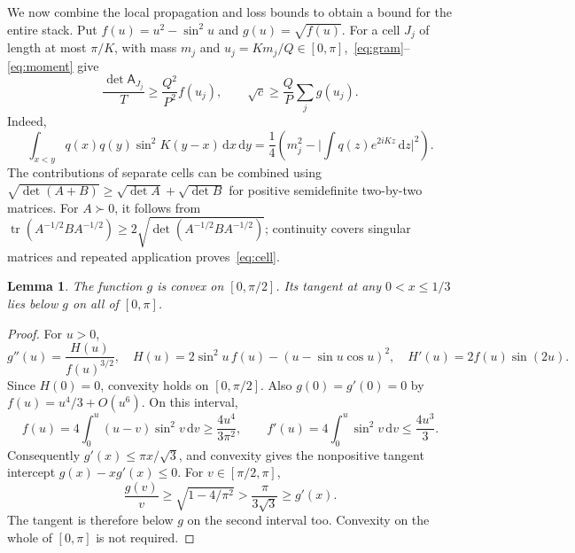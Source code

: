 \documentclass[11pt,a4paper]{article}
\newtheorem{lemma}[theorem]{Lemma}
\theoremstyle{remark}
\newcommand{\abs}[1]{\lvert #1\rvert}
\newcommand{\dd}{\,\mathrm d}
\newcommand{\tr}{\operatorname{tr}}
\begin{document}
We now combine the local propagation and loss bounds to obtain a bound for the entire stack. Put $f(u)=u^2-\sin^2u$ and $g(u)=\sqrt{f(u)}$. For a cell $J_j$ of length at most $\pi/K$, with mass $m_j$ and $u_j=Km_j/Q\in[0,\pi]$,~\eqref{eq:gram}--\eqref{eq:moment} give
\begin{equation}\label{eq:cell}
 \frac{\det\mathsf A_{J_j}}T\geq\frac{Q^2}{P^2}f(u_j),\qquad
 \sqrt c\geq\frac QP\sum_j g(u_j).
\end{equation}
Indeed,
\[
 \int_{x<y}q(x)q(y)\sin^2K(y-x)\dd x\dd y
 =\frac14\left(m_j^2-\abs{\int q(z)e^{2iKz}\dd z}^2\right).
\]
The contributions of separate cells can be combined using $\sqrt{\det(A+B)}\geq\sqrt{\det A}+\sqrt{\det B}$ for positive semidefinite two-by-two matrices. For $A\succ0$, it follows from $\tr(A^{-1/2}BA^{-1/2})\geq2\sqrt{\det(A^{-1/2}BA^{-1/2})}$; continuity covers singular matrices and repeated application proves~\eqref{eq:cell}.

\begin{lemma}\label{lem:tangent}
The function $g$ is convex on $[0,\pi/2]$. Its tangent at any $0<x\leq1/3$ lies below $g$ on all of $[0,\pi]$.
\end{lemma}
\begin{proof}
For $u>0$,
\[
 g''(u)=\frac{H(u)}{f(u)^{3/2}},\quad
 H(u)=2\sin^2u\,f(u)-(u-\sin u\cos u)^2,\quad
 H'(u)=2f(u)\sin(2u).
\]
Since $H(0)=0$, convexity holds on $[0,\pi/2]$. Also $g(0)=g'(0)=0$ by $f(u)=u^4/3+O(u^6)$. On this interval,
\[
 f(u)=4\int_0^u(u-v)\sin^2v\dd v\geq\frac{4u^4}{3\pi^2},\qquad
 f'(u)=4\int_0^u\sin^2v\dd v\leq\frac{4u^3}{3}.
\]
Consequently $g'(x)\leq\pi x/\sqrt3$, and convexity gives the nonpositive tangent intercept $g(x)-xg'(x)\leq0$. For $v\in[\pi/2,\pi]$,
\[
 \frac{g(v)}v\geq\sqrt{1-4/\pi^2}>\frac\pi{3\sqrt3}\geq g'(x).
\]
The tangent is therefore below $g$ on the second interval too. Convexity on the whole of $[0,\pi]$ is not required.
\end{proof}
\end{document}
